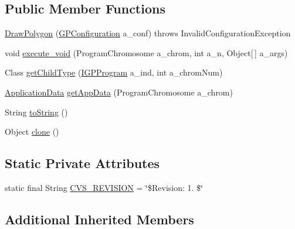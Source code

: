 \subsection*{Public Member Functions}
\begin{DoxyCompactItemize}
\item 
\hyperlink{classexamples_1_1gp_1_1monalisa_1_1core_1_1commands_1_1_draw_polygon_af289d52b6f7b0a951873e5cd7082a27f}{Draw\-Polygon} (\hyperlink{classorg_1_1jgap_1_1gp_1_1impl_1_1_g_p_configuration}{G\-P\-Configuration} a\-\_\-conf)  throws Invalid\-Configuration\-Exception 
\item 
void \hyperlink{classexamples_1_1gp_1_1monalisa_1_1core_1_1commands_1_1_draw_polygon_abc4e8cafa46a4eb917bc4733e1934624}{execute\-\_\-void} (Program\-Chromosome a\-\_\-chrom, int a\-\_\-n, Object\mbox{[}$\,$\mbox{]} a\-\_\-args)
\item 
Class \hyperlink{classexamples_1_1gp_1_1monalisa_1_1core_1_1commands_1_1_draw_polygon_ab302f3eff6ee238b448efa84bc365244}{get\-Child\-Type} (\hyperlink{interfaceorg_1_1jgap_1_1gp_1_1_i_g_p_program}{I\-G\-P\-Program} a\-\_\-ind, int a\-\_\-chrom\-Num)
\item 
\hyperlink{classexamples_1_1gp_1_1monalisa_1_1core_1_1_application_data}{Application\-Data} \hyperlink{classexamples_1_1gp_1_1monalisa_1_1core_1_1commands_1_1_draw_polygon_a707bab10bac8af400e174a933ed0259d}{get\-App\-Data} (Program\-Chromosome a\-\_\-chrom)
\item 
String \hyperlink{classexamples_1_1gp_1_1monalisa_1_1core_1_1commands_1_1_draw_polygon_a9ace04e3028a5efdc125ce6eb010b3ea}{to\-String} ()
\item 
Object \hyperlink{classexamples_1_1gp_1_1monalisa_1_1core_1_1commands_1_1_draw_polygon_acf2774c53d125c01b4ada55ee13cc72d}{clone} ()
\end{DoxyCompactItemize}
\subsection*{Static Private Attributes}
\begin{DoxyCompactItemize}
\item 
static final String \hyperlink{classexamples_1_1gp_1_1monalisa_1_1core_1_1commands_1_1_draw_polygon_a9a1a3c2e53be559009ffa69cf6bc0843}{C\-V\-S\-\_\-\-R\-E\-V\-I\-S\-I\-O\-N} = \char`\"{}\$Revision\-: 1. \$\char`\"{}
\end{DoxyCompactItemize}
\subsection*{Additional Inherited Members}


